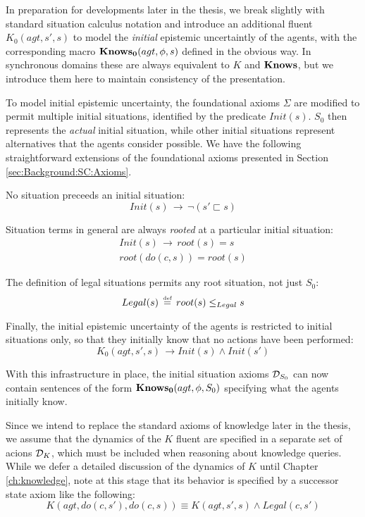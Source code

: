 In preparation for developments later in the thesis, we break slightly
with standard situation calculus notation and introduce an additional
fluent $K_{0}(agt,s',s)$ to model the \emph{initial} epistemic uncertaintly
of the agents, with the corresponding macro $\mathbf{Knows_{0}}(agt,\phi,s)$
defined in the obvious way. In synchronous domains these are always
equivalent to $K$ and $\mathbf{Knows}$, but we introduce them here to maintain
consistency of the presentation.

To model initial epistemic uncertainty, the foundational axioms $\Sigma$
are modified to permit multiple initial situations, identified by
the predicate $Init(s)$. $S_{0}$ then represents the \emph{actual}
initial situation, while other initial situations represent alternatives
that the agents consider possible. We have the following straightforward
extensions of the foundational axioms presented in Section \ref{sec:Background:SC:Axioms}.

No situation preceeds an initial situation:\[
Init(s)\,\rightarrow\,\neg(s'\sqsubset s)\]


Situation terms in general are always \emph{rooted} at a particular
initial situation:\begin{gather*}
Init(s)\,\rightarrow\, root(s)=s\\
root(do(c,s))=root(s)\end{gather*}


The definition of legal situations permits any root situation, not
just $S_{0}$:\[
Legal(s)\,\stackrel{\mbox{\tiny def}}{=}\, root(s)\leq_{Legal}s\]


Finally, the initial epistemic uncertainty of the agents is restricted
to initial situations only, so that they initially know that no actions
have been performed:\[
K_{0}(agt,s',s)\,\rightarrow Init(s)\wedge Init(s')\]


With this infrastructure in place, the initial situation axioms $\mathcal{D}_{S_{0}}$
can now contain sentences of the form $\mathbf{Knows_{0}}(agt,\phi,S_{0})$ specifying
what the agents initially know.

Since we intend to replace the standard axioms of knowledge later
in the thesis, we assume that the dynamics of the $K$ fluent are
specified in a separate set of acions $\mathcal{D}_{K}$, which must be included
when reasoning about knowledge queries. While we defer a detailed
discussion of the dynamics of $K$ until Chapter \ref{ch:knowledge},
note at this stage that its behavior is specified by a successor state
axiom like the following:\[
K(agt,do(c,s'),do(c,s))\equiv K(agt,s',s)\wedge Legal(c,s')\]


